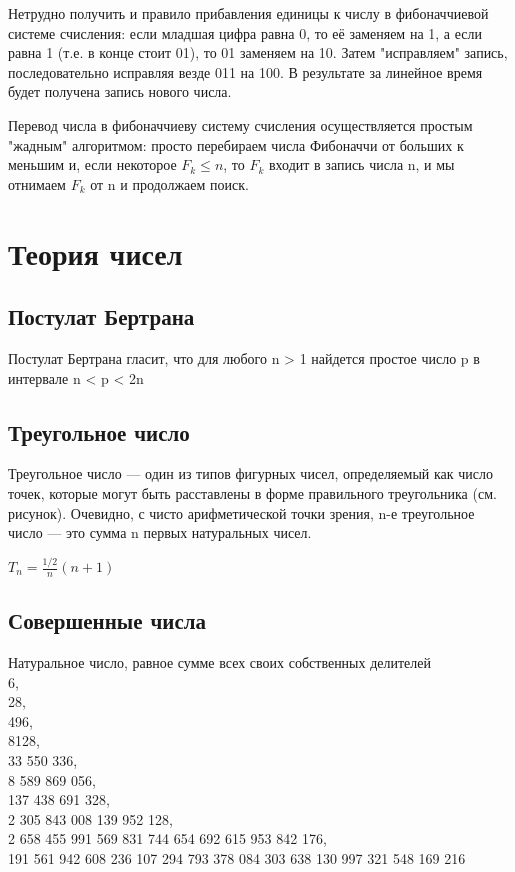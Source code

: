 \documentclass[a4paper]{article}
\begin{document}
\begin{multicols*}{2}
		 Нетрудно получить и правило прибавления единицы к числу в фибоначчиевой системе счисления: если младшая цифра равна 0, то её заменяем на 1, а если равна 1 (т.е. в конце стоит 01), то 01 заменяем на 10. Затем "исправляем" запись, последовательно исправляя везде 011 на 100. В результате за линейное время будет получена запись нового числа.
		 
		 Перевод числа в фибоначчиеву систему счисления осуществляется простым "жадным" алгоритмом: просто перебираем числа Фибоначчи от больших к меньшим и, если некоторое $F_k \le n$, то $F_k$ входит в запись числа n, и мы отнимаем $F_k$ от n и продолжаем поиск.
		 
		  \section{Теория чисел}
		  \subsection{Постулат Бертрана}
		  Постулат Бертрана гласит, что для любого n > 1 найдется простое число p в интервале n < p < 2n
		  \subsection{Треугольное число}
		  Треугольное число — один из типов фигурных чисел, определяемый как число точек, которые могут быть расставлены в форме правильного треугольника (см. рисунок). Очевидно, с чисто арифметической точки зрения, n-е треугольное число — это сумма n первых натуральных чисел.
		  
		  $T_n = \frac{1/2}n(n+1)$
		  \subsection{Совершенные числа}
		  Натуральное число, равное сумме всех своих собственных делителей\\
		  6,\\
		  28,\\
		  496,\\
		  8128,\\
		  33 550 336,\\
		  8 589 869 056,\\
		  137 438 691 328,\\
		  2 305 843 008 139 952 128,\\
		  2 658 455 991 569 831 744 654 692 615 953 842 176,\\
		  191 561 942 608 236 107 294 793 378 084 303 638 130 997 321 548 169 216

\end{multicols*}
\end{document}
